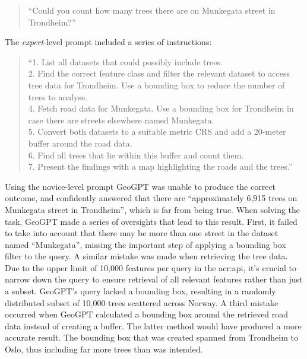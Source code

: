 \begin{quote}
    \enquote{Could you count how many trees there are on Munkegata street in Trondheim?}
\end{quote}

\noindent The \textit{expert}-level prompt included a series of instructions:

\begin{quote}
    \enquote{1. List all datasets that could possibly include trees. \\
        2. Find the correct feature class and filter the relevant dataset to access tree data for Trondheim. Use a bounding box to reduce the number of trees to analyse. \\
        4. Fetch road data for Munkegata. Use a bounding box for Trondheim in case there are streets elsewhere named Munkegata. \\
        5. Convert both datasets to a suitable metric CRS and add a 20-meter buffer around the road data. \\
        6. Find all trees that lie within this buffer and count them. \\
        7. Present the findings with a map highlighting the roads and the trees.}
\end{quote}

\FloatBarrier

Using the novice-level prompt GeoGPT was unable to produce the correct outcome, and confidently answered that there are \enquote{approximately 6,915 trees on Munkegata street in Trondheim}, which is far from being true. When solving the task, GeoGPT made a series of oversights that lead to this result. First, it failed to take into account that there may be more than one street in the dataset named \enquote{Munkegata}, missing the important step of applying a bounding box filter to the query. A similar mistake was made when retrieving the tree data. Due to the upper limit of 10,000 features per query in the \acrshort{acr:api}, it's crucial to narrow down the query to ensure retrieval of all relevant features rather than just a subset. GeoGPT's query lacked a bounding box, resulting in a randomly distributed subset of 10,000 trees scattered across Norway. A third mistake occurred when GeoGPT calculated a bounding box around the retrieved road data instead of creating a buffer. The latter method would have produced a more accurate result. The bounding box that was created spanned from Trondheim to Oslo, thus including far more trees than was intended.

